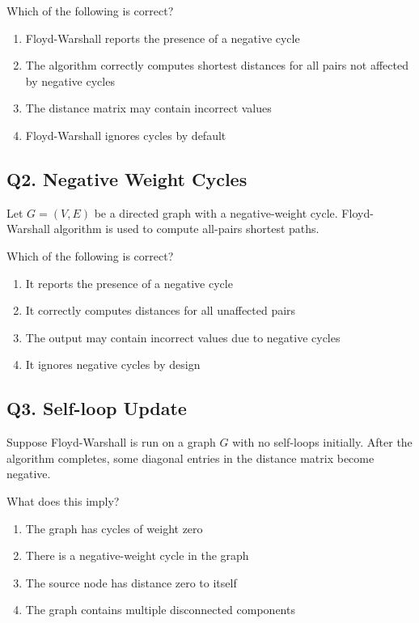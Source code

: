 Which of the following is correct?

\begin{enumerate}[label=(\alph*)]
    \item Floyd-Warshall reports the presence of a negative cycle
    \item The algorithm correctly computes shortest distances for all pairs not affected by negative cycles
    \item The distance matrix may contain incorrect values
    \item Floyd-Warshall ignores cycles by default
\end{enumerate}

\subsection*{Q2. Negative Weight Cycles}
Let $G = (V, E)$ be a directed graph with a negative-weight cycle. Floyd-Warshall algorithm is used to compute all-pairs shortest paths.

Which of the following is correct?

\begin{enumerate}[label=(\alph*)]
    \item It reports the presence of a negative cycle
    \item It correctly computes distances for all unaffected pairs
    \item The output may contain incorrect values due to negative cycles
    \item It ignores negative cycles by design
\end{enumerate}

\subsection*{Q3. Self-loop Update}
Suppose Floyd-Warshall is run on a graph $G$ with no self-loops initially. After the algorithm completes, some diagonal entries in the distance matrix become negative.

What does this imply?

\begin{enumerate}[label=(\alph*)]
    \item The graph has cycles of weight zero
    \item There is a negative-weight cycle in the graph
    \item The source node has distance zero to itself
    \item The graph contains multiple disconnected components
\end{enumerate}

